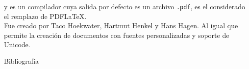 \documentclass[12pt,aspectratio=43]{beamer}
\newcommand{\lmr}{\fontfamily{lmr}\selectfont}
\begin{document}
\begin{frame}{{\LuaTeX} y {\LuaLaTeX}}{}
{\LuaLaTeX} es un compilador cuya salida por defecto es un archivo {\tt .pdf}, es el considerado el remplazo de {\lmr PDF\LaTeX}.\pause\\[1em]

Fue creado por Taco Hoekwater, Hartmut Henkel y Hans Hagen. Al igual que {\XeLaTeX} permite la creación de documentos con fuentes personalizadas y soporte de Unicode.
\end{frame}

\begin{frame}[allowframebreaks]{Bibliografía}
\nocite{*}


\end{frame}
\end{document}
